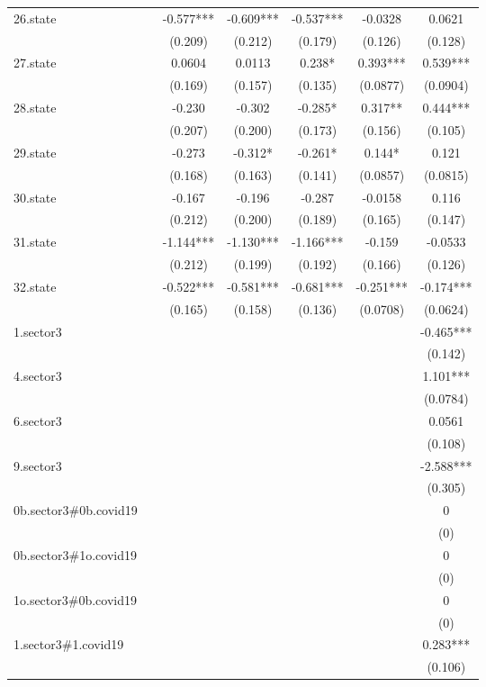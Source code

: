 \documentclass[]{article}
\begin{document}
\begin{tabular}{lcccccc}
26.state &  & -0.577*** & -0.609*** & -0.537*** & -0.0328 & 0.0621 \\
 &  & (0.209) & (0.212) & (0.179) & (0.126) & (0.128) \\
27.state &  & 0.0604 & 0.0113 & 0.238* & 0.393*** & 0.539*** \\
 &  & (0.169) & (0.157) & (0.135) & (0.0877) & (0.0904) \\
28.state &  & -0.230 & -0.302 & -0.285* & 0.317** & 0.444*** \\
 &  & (0.207) & (0.200) & (0.173) & (0.156) & (0.105) \\
29.state &  & -0.273 & -0.312* & -0.261* & 0.144* & 0.121 \\
 &  & (0.168) & (0.163) & (0.141) & (0.0857) & (0.0815) \\
30.state &  & -0.167 & -0.196 & -0.287 & -0.0158 & 0.116 \\
 &  & (0.212) & (0.200) & (0.189) & (0.165) & (0.147) \\
31.state &  & -1.144*** & -1.130*** & -1.166*** & -0.159 & -0.0533 \\
 &  & (0.212) & (0.199) & (0.192) & (0.166) & (0.126) \\
32.state &  & -0.522*** & -0.581*** & -0.681*** & -0.251*** & -0.174*** \\
 &  & (0.165) & (0.158) & (0.136) & (0.0708) & (0.0624) \\
1.sector3 &  &  &  &  &  & -0.465*** \\
 &  &  &  &  &  & (0.142) \\
4.sector3 &  &  &  &  &  & 1.101*** \\
 &  &  &  &  &  & (0.0784) \\
6.sector3 &  &  &  &  &  & 0.0561 \\
 &  &  &  &  &  & (0.108) \\
9.sector3 &  &  &  &  &  & -2.588*** \\
 &  &  &  &  &  & (0.305) \\
0b.sector3\#0b.covid19 &  &  &  &  &  & 0 \\
 &  &  &  &  &  & (0) \\
0b.sector3\#1o.covid19 &  &  &  &  &  & 0 \\
 &  &  &  &  &  & (0) \\
1o.sector3\#0b.covid19 &  &  &  &  &  & 0 \\
 &  &  &  &  &  & (0) \\
1.sector3\#1.covid19 &  &  &  &  &  & 0.283*** \\
 &  &  &  &  &  & (0.106) \\

\end{tabular}
\end{document}
